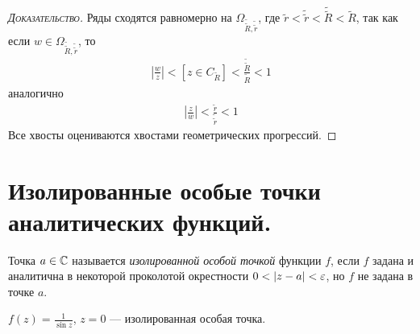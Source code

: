 \documentclass[../../main.tex]{subfiles}
\begin{document}
\begin{proof}[\normalfont\textsc{Доказательство}]
 Ряды сходятся равномерно на $ \Omega_{\tilde{\tilde R}, \tilde{\tilde r}} $, где $ \tilde r < \tilde{\tilde r} < \tilde {\tilde R} < \tilde R $, так как если $ w \in \Omega_{\tilde{\tilde R}, \tilde{\tilde r}} $, то
 \begin{align*}
  \left| \frac{w}{z} \right| < [z \in C_{\tilde R}] < \frac{\tilde{\tilde R}}{\tilde R} < 1
 \end{align*} аналогично
 \begin{align*}
  \left| \frac{z}{w} \right| < \frac{\tilde r}{\tilde{\tilde r}} < 1
 \end{align*} Все хвосты оцениваются хвостами геометрических прогрессий.
\end{proof}

\newpage
\section{Изолированные особые точки аналитических функций.}
\begin{df}
 Точка $ a \in \mathbb{C} $ называется \textit{изолированной особой точкой} функции $ f $, если $ f $ задана и аналитична в некоторой проколотой окрестности $ 0 < \left| z-a \right| < \varepsilon $, но $ f $ не задана в точке $ a $.
\end{df}
\begin{exmpl}
 $ f(z) = \frac{1}{\sin z} $, $ z = 0 $ --- изолированная особая точка.
\end{exmpl}
\end{document}
